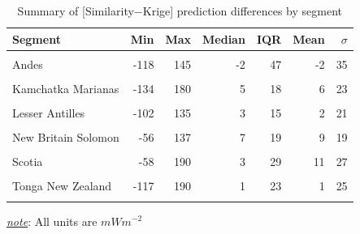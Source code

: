 \begin{table}

\caption{\label{tab:diffSummaryTable}Summary of [Similarity$-$Krige] prediction differences by segment}
\centering
\begin{threeparttable}
\begin{tabular}[t]{lrrrrrr}
\toprule
Segment & Min & Max & Median & IQR & Mean & $\sigma$\\
\midrule
\cellcolor{gray!6}{Alaska Aleutians} & \cellcolor{gray!6}{-141} & \cellcolor{gray!6}{126} & \cellcolor{gray!6}{2} & \cellcolor{gray!6}{21} & \cellcolor{gray!6}{1} & \cellcolor{gray!6}{22}\\
Andes & -118 & 145 & -2 & 47 & -2 & 35\\
\cellcolor{gray!6}{Central America} & \cellcolor{gray!6}{-109} & \cellcolor{gray!6}{203} & \cellcolor{gray!6}{12} & \cellcolor{gray!6}{47} & \cellcolor{gray!6}{21} & \cellcolor{gray!6}{40}\\
Kamchatka Marianas & -134 & 180 & 5 & 18 & 6 & 23\\
\cellcolor{gray!6}{Kyushu Ryukyu} & \cellcolor{gray!6}{-110} & \cellcolor{gray!6}{186} & \cellcolor{gray!6}{4} & \cellcolor{gray!6}{22} & \cellcolor{gray!6}{5} & \cellcolor{gray!6}{24}\\
Lesser Antilles & -102 & 135 & 3 & 15 & 2 & 21\\
\cellcolor{gray!6}{N Philippines} & \cellcolor{gray!6}{-72} & \cellcolor{gray!6}{150} & \cellcolor{gray!6}{8} & \cellcolor{gray!6}{23} & \cellcolor{gray!6}{11} & \cellcolor{gray!6}{21}\\
New Britain Solomon & -56 & 137 & 7 & 19 & 9 & 19\\
\cellcolor{gray!6}{S Philippines} & \cellcolor{gray!6}{-67} & \cellcolor{gray!6}{193} & \cellcolor{gray!6}{6} & \cellcolor{gray!6}{23} & \cellcolor{gray!6}{9} & \cellcolor{gray!6}{22}\\
Scotia & -58 & 190 & 3 & 29 & 11 & 27\\
\cellcolor{gray!6}{Sumatra Banda Sea} & \cellcolor{gray!6}{-134} & \cellcolor{gray!6}{143} & \cellcolor{gray!6}{3} & \cellcolor{gray!6}{20} & \cellcolor{gray!6}{2} & \cellcolor{gray!6}{20}\\
Tonga New Zealand & -117 & 190 & 1 & 23 & 1 & 25\\
\cellcolor{gray!6}{Vanuatu} & \cellcolor{gray!6}{-147} & \cellcolor{gray!6}{205} & \cellcolor{gray!6}{14} & \cellcolor{gray!6}{31} & \cellcolor{gray!6}{13} & \cellcolor{gray!6}{34}\\
\bottomrule
\end{tabular}
\begin{tablenotes}
\item \uline{\textit{note}}: All units are $mWm^{-2}$
\end{tablenotes}
\end{threeparttable}
\end{table}

